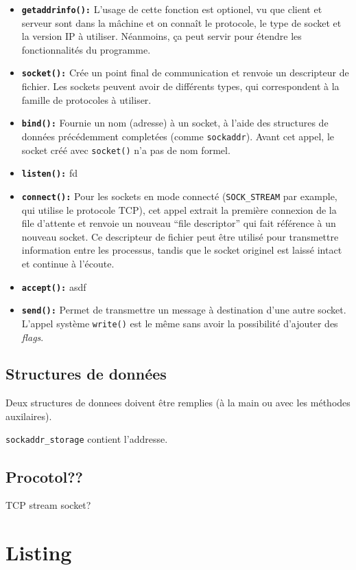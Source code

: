 \documentclass[11pt,a4paper]{article}
\begin{document}
\begin{itemize}
\item \texttt{\textbf{getaddrinfo():}} L'usage de cette fonction est optionel,
  vu que client et serveur sont dans la mâchine et on connaît le
  protocole, le type de socket et la version IP à utiliser. Néanmoins,
  ça peut servir pour étendre les fonctionnalités du programme.
\item \texttt{\textbf{socket():}} Crée un point final de communication et
  renvoie un descripteur de fichier. Les sockets peuvent avoir de
  différents types, qui correspondent à la famille de protocoles à
  utiliser.
\item \texttt{\textbf{bind():}} Fournie un nom (adresse) à un socket, à l'aide
  des structures de données précédemment completées (comme
  \texttt{sockaddr}). Avant cet appel, le socket créé avec
  \texttt{socket()} n'a pas de nom formel.
\item \texttt{\textbf{listen():}} fd
\item \texttt{\textbf{connect():}} Pour les sockets en mode connecté
  (\texttt{SOCK\_STREAM} par example, qui utilise le protocole TCP),
  cet appel extrait la première connexion de la file d'attente et
  renvoie un nouveau ``file descriptor'' qui fait référence à un
  nouveau socket. Ce descripteur de fichier peut être utilisé pour
  transmettre information entre les processus, tandis que le socket
  originel est laissé intact et continue à l'écoute.
\item \texttt{\textbf{accept():}} asdf
\item \texttt{\textbf{send():}} Permet de transmettre un message à destination
  d'une autre socket. L'appel système \texttt{write()} est le même
  sans avoir la possibilité d'ajouter des \emph{flags}.
\end{itemize}


\subsection{Structures de données}
\label{sec:struct}

Deux structures de donnees doivent être remplies (à la main ou avec
les méthodes auxilaires).

\texttt{sockaddr\_storage} contient l'addresse.

\subsection{Procotol??}
\label{sec:prot}

TCP stream socket?



\newpage

\section{Listing}


\newpage

\newpage

\end{document}
